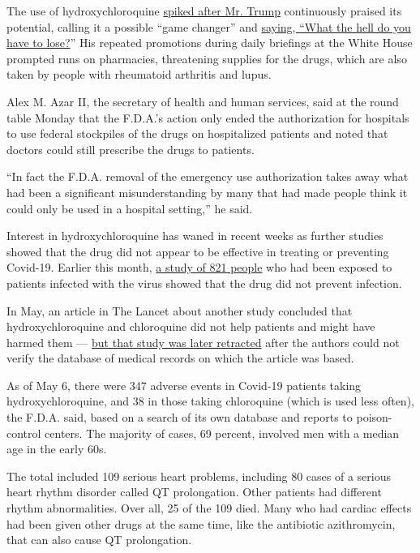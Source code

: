 The use of hydroxychloroquine
\href{https://www.nytimes.com/2020/04/25/us/coronavirus-trump-chloroquine-hydroxychloroquine.html}{spiked
after Mr. Trump} continuously praised its potential, calling it a
possible ``game changer'' and
\href{https://www.nytimes.com/2020/03/20/health/coronavirus-chloroquine-trump.html}{saying,
``What the hell do you have to lose?}'' His repeated promotions during
daily briefings at the White House prompted runs on pharmacies,
threatening supplies for the drugs, which are also taken by people with
rheumatoid arthritis and lupus.

Alex M. Azar II, the secretary of health and human services, said at the
round table Monday that the F.D.A.'s action only ended the authorization
for hospitals to use federal stockpiles of the drugs on hospitalized
patients and noted that doctors could still prescribe the drugs to
patients.

``In fact the F.D.A. removal of the emergency use authorization takes
away what had been a significant misunderstanding by many that had made
people think it could only be used in a hospital setting,'' he said.

Interest in hydroxychloroquine has waned in recent weeks as further
studies showed that the drug did not appear to be effective in treating
or preventing Covid-19. Earlier this month,
\href{https://www.nytimes.com/2020/06/03/health/hydroxychloroquine-coronavirus-trump.html}{a
study of 821 people} who had been exposed to patients infected with the
virus showed that the drug did not prevent infection.

In May, an article in The Lancet about another study concluded that
hydroxychloroquine and chloroquine did not help patients and might have
harmed them ---
\href{https://www.nytimes.com/2020/06/04/health/coronavirus-hydroxychloroquine.html}{but
that study was later retracted} after the authors could not verify the
database of medical records on which the article was based.

As of May 6, there were 347 adverse events in Covid-19 patients taking
hydroxychloroquine, and 38 in those taking chloroquine (which is used
less often), the F.D.A. said, based on a search of its own database and
reports to poison-control centers. The majority of cases, 69 percent,
involved men with a median age in the early 60s.

The total included 109 serious heart problems, including 80 cases of a
serious heart rhythm disorder called QT prolongation. Other patients had
different rhythm abnormalities. Over all, 25 of the 109 died. Many who
had cardiac effects had been given other drugs at the same time, like
the antibiotic azithromycin, that can also cause QT prolongation.

